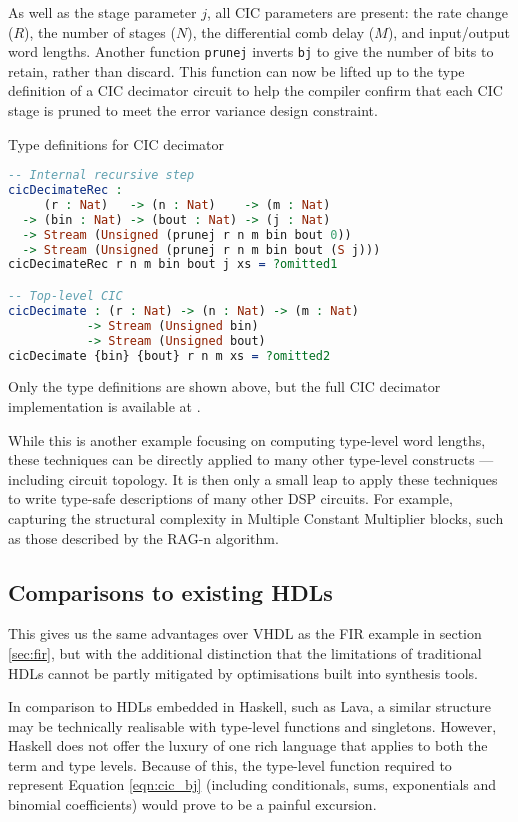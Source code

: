 \documentclass[conference]{IEEEtran}
\begin{document}
As well as the stage parameter $j$, all CIC parameters are present: the rate
change ($R$), the number of stages ($N$), the differential comb delay ($M$), and
input/output word lengths. Another function \texttt{prunej} inverts
\texttt{bj} to give the number of bits to retain, rather than discard. This
function can now be lifted up to the type definition of a CIC decimator circuit
to help the compiler confirm that each CIC stage is pruned to meet the error
variance design constraint.

\begin{codefig}[h]
  \caption{Type definitions for CIC decimator}
\begin{lstlisting}[language=idris]
-- Internal recursive step
cicDecimateRec :
     (r : Nat)   -> (n : Nat)    -> (m : Nat)
  -> (bin : Nat) -> (bout : Nat) -> (j : Nat)
  -> Stream (Unsigned (prunej r n m bin bout 0))
  -> Stream (Unsigned (prunej r n m bin bout (S j)))
cicDecimateRec r n m bin bout j xs = ?omitted1

-- Top-level CIC
cicDecimate : (r : Nat) -> (n : Nat) -> (m : Nat)
           -> Stream (Unsigned bin)
           -> Stream (Unsigned bout)
cicDecimate {bin} {bout} r n m xs = ?omitted2
\end{lstlisting}
\label{lst:cic_types}
\end{codefig}

Only the type definitions are shown above, but the full CIC decimator
implementation is available at \cite{ramsay_20_gh}.

While this is another example focusing on computing type-level word lengths,
these techniques can be directly applied to many other type-level constructs ---
including circuit topology. It is then only a small leap to apply these
techniques to write type-safe descriptions of many other DSP circuits. For
example, capturing the structural complexity in Multiple Constant Multiplier
blocks, such as those described by the RAG-n algorithm\cite{dempster_95}.

\subsection{Comparisons to existing HDLs}

This gives us the same advantages over VHDL as the FIR example in section
\ref{sec:fir}, but with the additional distinction that the limitations of
traditional HDLs cannot be partly mitigated by optimisations built into
synthesis tools.

In comparison to HDLs embedded in Haskell, such as Lava, a similar structure may
be technically realisable with type-level functions and singletons. However,
Haskell does not offer the luxury of one rich language that applies to both the
term and type levels. Because of this, the type-level function required to
represent Equation \ref{eqn:cic_bj} (including conditionals, sums, exponentials
and binomial coefficients) would prove to be a painful excursion.
\end{document}
